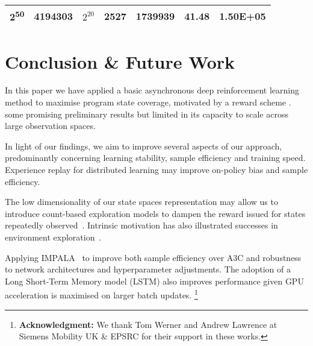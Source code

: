 \documentclass[runningheads]{llncs}
\begin{document}
\begin{table}[h]
\begin{tabular}{|c|c|c!{\color{black}\vrule}c|c|c|c|}
		\hline
		{}2\textsuperscript{50}                                                           & 4194303                                                                                                                    & {}$2^{20}$          & 2527                                                       & {}1739939                                                                                                                                                      & 41.48                                                      & {}1.50E+05                                                                                                                                                      \\
		\hline
	\end{tabular}
	\label{tab:results}
\end{table}

\section{Conclusion \& Future Work }
In this paper we have applied a basic asynchronous deep reinforcement learning method to maximise program state coverage, motivated by a reward scheme . some promising preliminary results but limited in its capacity to scale across large observation spaces. 

In light of our findings, we aim to improve several aspects of our approach, predominantly concerning learning stability, sample efficiency and training speed. Experience replay for distributed learning may improve on-policy bias and sample efficiency. 

The low dimensionality of our state spaces representation may allow us to introduce count-based exploration models to dampen the reward issued for states repeatedly observed~\cite{ostrovski2017countbased}. Intrinsic motivation has also illustrated successes in environment exploration~\cite{houthooft2017vime}.

Applying IMPALA~\cite{espeholt2018impala} to improve both sample efficiency over A3C and robustness to network architectures and hyperparameter adjustments. The adoption of a Long Short-Term Memory model (LSTM) also improves performance given GPU acceleration is maximised on larger batch updates.
\footnote{\textbf{Acknowledgment:} We thank Tom Werner and Andrew Lawrence at Siemens Mobility UK \& EPSRC for their support in these works. }

 
%
%


%
% 
% 
%
\end{document}
